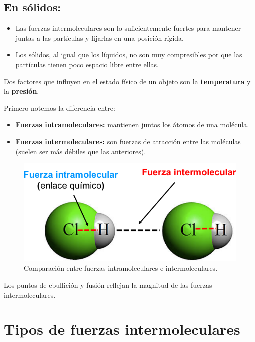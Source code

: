 \documentclass[]{article}
\begin{document}
\subsection{En sólidos:}  

\begin{itemize}
	\item Las fuerzas intermoleculares son lo suficientemente fuertes para mantener juntas a las partículas y fijarlas en una posición rígida.
	\item Los sólidos, al igual que los líquidos, no son muy compresibles por que las partículas tienen poco espacio libre entre ellas.
\end{itemize}

Dos factores que influyen en el estado físico de un objeto son la \textbf{temperatura} y la \textbf{presión}.

Primero notemos la diferencia entre:

\begin{itemize}
	\item \textbf{Fuerzas intramoleculares:} mantienen juntos los átomos de una molécula.
	\item \textbf{Fuerzas intermoleculares:} son fuerzas de atracción entre las moléculas (suelen ser más débiles que las anteriores).
\end{itemize}

\begin{figure}[H]
\center
\includegraphics[scale=0.3]{foto4.png}
\caption{Comparación entre fuerzas intramoleculares e intermoleculares.}
\end{figure}

Los puntos de ebullición y fusión reflejan la magnitud de las fuerzas intermoleculares.



\section{Tipos de fuerzas intermoleculares}
\end{document}

